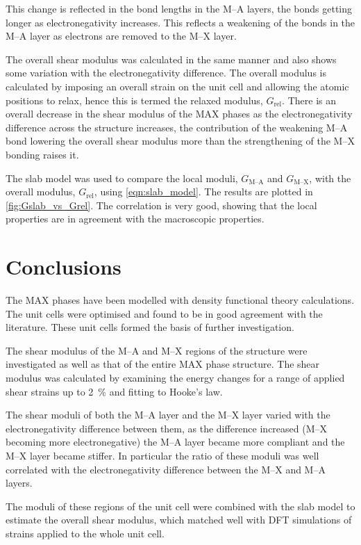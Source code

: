 This change is reflected in the bond lengths in the M--A layers, the bonds getting longer as electronegativity increases. This reflects a weakening of the bonds in the M--A layer as electrons are removed to the M--X layer.




The overall shear modulus was calculated in the same manner and also shows some variation with the electronegativity difference. The overall modulus is calculated by imposing an overall strain on the unit cell and allowing the atomic positions to relax, hence this is termed the relaxed modulus, $G_{\text{rel}}$. There is an overall decrease in the shear modulus of the MAX phases as the electronegativity difference across the structure increases, the contribution of the weakening M--A bond lowering the overall shear modulus more than the strengthening of the M--X bonding raises it.


The slab model was used to compare the local moduli, $G_{\text{M--A}}$ and $G_{\text{M--X}}$,  with the overall modulus, $G_{\text{rel}}$, using \autoref{eqn:slab_model}. The results are plotted in \autoref{fig:Gslab_vs_Grel}. The correlation is very good, showing that the local properties are in agreement with the macroscopic properties.



\section{Conclusions}

The MAX phases have been modelled with density functional theory calculations. The unit cells were optimised and found to be in good agreement with the literature. These unit cells formed the basis of further investigation.

The shear modulus of the M--A and M--X regions of the structure were investigated as well as that of the entire MAX phase structure. The shear modulus was calculated by examining the energy changes for a range of applied shear strains up to \SI{2}{\percent} and fitting to Hooke's law.

The shear moduli of both the M--A layer and the M--X layer varied with the electronegativity difference between them, as the difference increased (M--X becoming more electronegative) the M--A layer became more compliant and the M--X layer became stiffer. In particular the ratio of these moduli was well correlated with the electronegativity difference between the M--X and M--A layers.

The moduli of these regions of the unit cell were combined with the slab model to estimate the overall shear modulus, which matched well with DFT simulations of strains applied to the whole unit cell.





























